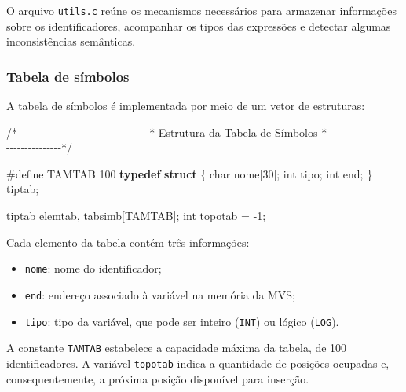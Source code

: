 \documentclass[
  brazilian,
  letterpaper,
]{book}
\newenvironment{Shaded}{\begin{snugshade}}{\end{snugshade}}
\newcommand{\CommentTok}[1]{\textcolor[rgb]{0.37,0.37,0.37}{#1}}
\newcommand{\DataTypeTok}[1]{\textcolor[rgb]{0.68,0.00,0.00}{#1}}
\newcommand{\DecValTok}[1]{\textcolor[rgb]{0.68,0.00,0.00}{#1}}
\newcommand{\KeywordTok}[1]{\textcolor[rgb]{0.00,0.23,0.31}{\textbf{#1}}}
\newcommand{\NormalTok}[1]{\textcolor[rgb]{0.00,0.23,0.31}{#1}}
\newcommand{\OperatorTok}[1]{\textcolor[rgb]{0.37,0.37,0.37}{#1}}
\newcommand{\PreprocessorTok}[1]{\textcolor[rgb]{0.68,0.00,0.00}{#1}}
\providecommand{\tightlist}{%
  \setlength{\itemsep}{0pt}\setlength{\parskip}{0pt}}
\theoremstyle{plain}
\theoremstyle{definition}
\theoremstyle{remark}
\begin{document}
O arquivo \texttt{utils.c} reúne os mecanismos necessários para
armazenar informações sobre os identificadores, acompanhar os tipos das
expressões e detectar algumas inconsistências semânticas.

\subsubsection{Tabela de símbolos}\label{tabela-de-suxedmbolos-1}

A tabela de símbolos é implementada por meio de um vetor de estruturas:

\begin{Shaded}
\begin{Highlighting}[]
\CommentTok{/*{-}{-}{-}{-}{-}{-}{-}{-}{-}{-}{-}{-}{-}{-}{-}{-}{-}{-}{-}{-}{-}{-}{-}{-}{-}{-}{-}{-}{-}{-}{-}{-}{-}{-}{-}}
\CommentTok{ * Estrutura da Tabela de Símbolos}
\CommentTok{ *{-}{-}{-}{-}{-}{-}{-}{-}{-}{-}{-}{-}{-}{-}{-}{-}{-}{-}{-}{-}{-}{-}{-}{-}{-}{-}{-}{-}{-}{-}{-}{-}{-}{-}{-}*/}

\PreprocessorTok{\#define TAMTAB }\DecValTok{100}
\KeywordTok{typedef} \KeywordTok{struct}
\OperatorTok{\{}
    \DataTypeTok{char}\NormalTok{ nome}\OperatorTok{[}\DecValTok{30}\OperatorTok{];}
    \DataTypeTok{int}\NormalTok{ tipo}\OperatorTok{;}
    \DataTypeTok{int}\NormalTok{ end}\OperatorTok{;}
\OperatorTok{\}}\NormalTok{ tiptab}\OperatorTok{;}

\NormalTok{tiptab elemtab}\OperatorTok{,}\NormalTok{ tabsimb}\OperatorTok{[}\NormalTok{TAMTAB}\OperatorTok{];}
\DataTypeTok{int}\NormalTok{ topotab }\OperatorTok{=} \OperatorTok{{-}}\DecValTok{1}\OperatorTok{;}
\end{Highlighting}
\end{Shaded}

Cada elemento da tabela contém três informações:

\begin{itemize}
\tightlist
\item
  \texttt{nome}: nome do identificador;
\item
  \texttt{end}: endereço associado à variável na memória da MVS;
\item
  \texttt{tipo}: tipo da variável, que pode ser inteiro (\texttt{INT})
  ou lógico (\texttt{LOG}).
\end{itemize}

A constante \texttt{TAMTAB} estabelece a capacidade máxima da tabela, de
100 identificadores. A variável \texttt{topotab} indica a quantidade de
posições ocupadas e, consequentemente, a próxima posição disponível para
inserção.
\end{document}
